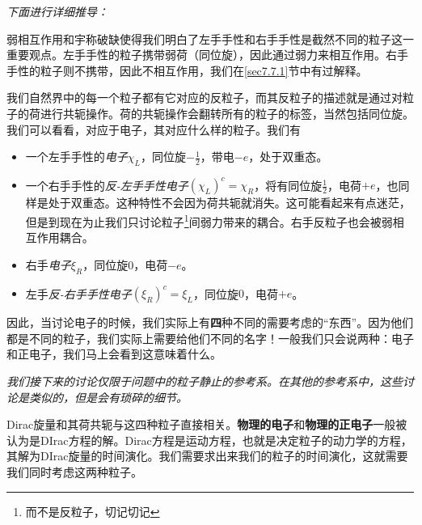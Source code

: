 {\itshape 下面进行详细推导：}

弱相互作用和宇称破缺使得我们明白了左手手性和右手手性是截然不同的粒子这一重要观点。左手手性的粒子携带弱荷（同位旋），因此通过弱力来相互作用。右手手性的粒子则不携带，因此不相互作用，我们在\ref{sec7.7.1}节中有过解释。

我们自然界中的每一个粒子都有它对应的反粒子，而其反粒子的描述就是通过对粒子的荷进行共轭操作。荷的共轭操作会翻转所有的粒子的标签，当然包括同位旋。我们可以看看，对应于电子，其对应什么样的粒子。我们有
\begin{itemize}
\item 一个左手手性的{\itshape 电子}$\chi_L$，同位旋$-\frac{1}{2}$，带电$-e$，处于双重态。
\item 一个右手手性的{\itshape 反-左手手性电子}$(\chi_L)^c=\chi_R$，将有同位旋$\frac{1}{2}$，电荷$+e$，也同样是处于双重态。这种特性不会因为荷共轭就消失。这可能看起来有点迷茫，但是到现在为止我们只讨论粒子\footnote{而不是反粒子，切记切记}间弱力带来的耦合。右手反粒子也会被弱相互作用耦合。
\item 右手{\itshape 电子}$\xi_R$，同位旋$0$，电荷$-e$。
\item 左手{\itshape 反-右手手性电子}$(\xi_R)^c=\xi_L$，同位旋$0$，电荷$+e$。
\end{itemize}

因此，当讨论电子的时候，我们实际上有{\bfseries 四}种不同的需要考虑的``东西''。因为他们都是不同的粒子，我们实际上需要给他们不同的名字！一般我们只会说两种：电子和正电子，我们马上会看到这意味着什么。

{\itshape 我们接下来的讨论仅限于问题中的粒子静止的参考系。在其他的参考系中，这些讨论是类似的，但是会有琐碎的细节。}

Dirac旋量和其荷共轭与这四种粒子直接相关。{\bfseries 物理的电子}和{\bfseries 物理的正电子}一般被认为是DIrac方程的解。Dirac方程是运动方程，也就是决定粒子的动力学的方程，其解为DIrac旋量的时间演化。我们需要求出来我们的粒子的时间演化，这就需要我们同时考虑这两种粒子。

